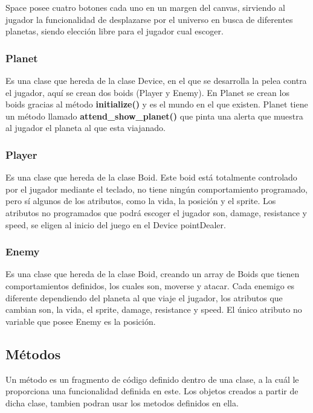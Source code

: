 \documentclass[a4paper,10pt]{article}
\begin{document}
Space posee cuatro botones cada uno en un margen del canvas, 
sirviendo al jugador la funcionalidad de desplazarse por el universo en 
busca de diferentes planetas, siendo elección libre para el jugador cual 
escoger. 
\cleardoublepage

\subsubsection{Planet}
Es una clase que hereda de la clase Device, en el que se desarrolla 
la pelea contra el jugador, aquí se crean dos boids (Player y Enemy).
En Planet se crean los boids gracias al método \textbf{initialize()} y es el mundo en el 
que existen.
Planet tiene un método llamado \textbf{attend\_show\_planet()} que pinta una alerta que muestra al jugador el planeta al que esta viajanado.

\subsubsection{Player}
Es una clase que hereda de la clase Boid. Este boid está totalmente 
controlado por el jugador mediante el teclado, no tiene ningún comportamiento 
programado, pero sí algunos de los atributos, como la vida, la posición y
el sprite. Los atributos no programados que podrá escoger el jugador son, 
damage, resistance y speed, se eligen al inicio del juego en el Device 
pointDealer.

\subsubsection{Enemy}
Es una clase que hereda de la clase Boid, creando un array de Boids 
que tienen comportamientos definidos, los cuales son, moverse y atacar.
Cada enemigo es diferente dependiendo del planeta al que viaje el jugador, 
los atributos que cambian son, la vida, el sprite, damage, resistance y speed. El único atributo no variable que posee Enemy es la posición.

\cleardoublepage


\subsection{Métodos}
Un método es un fragmento de código definido dentro de una clase, a la cuál le proporciona una funcionalidad definida en este.
Los objetos creados a partir de dicha clase, tambien podran usar los metodos definidos en ella.
 
\end{document}
